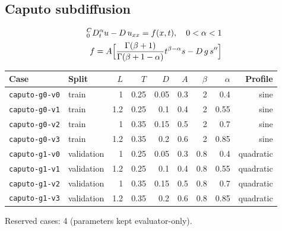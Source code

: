 \documentclass[11pt]{article}
\newcommand{\Caputo}[1]{{}^{C}_{0}D_t^{#1}}
\begin{document}
\subsection{Caputo subdiffusion}
\begin{align*}
\Caputo{\alpha}u - D\,u_{xx} = f(x,t),\quad 0<\alpha<1\\
f = A\Bigl[\frac{\Gamma(\beta+1)}{\Gamma(\beta+1-\alpha)}t^{\beta-\alpha}s - D\,g\,s''\Bigr]
\end{align*}
\begin{center}\small
\begin{tabular}{llrrrrrrr}
\toprule
Case & Split & $L$ & $T$ & $D$ & $A$ & $\beta$ & $\alpha$ & Profile \\
\midrule
\texttt{caputo-g0-v0} & train & 1 & 0.25 & 0.05 & 0.3 & 2 & 0.4 & sine \\
\texttt{caputo-g0-v1} & train & 1.2 & 0.25 & 0.1 & 0.4 & 2 & 0.55 & sine \\
\texttt{caputo-g0-v2} & train & 1 & 0.35 & 0.15 & 0.5 & 2 & 0.7 & sine \\
\texttt{caputo-g0-v3} & train & 1.2 & 0.35 & 0.2 & 0.6 & 2 & 0.85 & sine \\
\texttt{caputo-g1-v0} & validation & 1 & 0.25 & 0.05 & 0.3 & 0.8 & 0.4 & quadratic \\
\texttt{caputo-g1-v1} & validation & 1.2 & 0.25 & 0.1 & 0.4 & 0.8 & 0.55 & quadratic \\
\texttt{caputo-g1-v2} & validation & 1 & 0.35 & 0.15 & 0.5 & 0.8 & 0.7 & quadratic \\
\texttt{caputo-g1-v3} & validation & 1.2 & 0.35 & 0.2 & 0.6 & 0.8 & 0.85 & quadratic \\
\bottomrule
\end{tabular}
\end{center}
\noindent Reserved cases: 4 (parameters kept evaluator-only).
\end{document}
